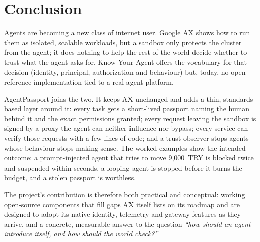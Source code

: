 \section{Conclusion}

Agents are becoming a new class of internet user. Google AX shows how to run them as isolated, scalable workloads, but a sandbox only protects the cluster from the agent; it does nothing to help the rest of the world decide whether to trust what the agent asks for. Know Your Agent offers the vocabulary for that decision (identity, principal, authorization and behaviour) but, today, no open reference implementation tied to a real agent platform.

AgentPassport joins the two. It keeps AX unchanged and adds a thin, standards-based layer around it: every task gets a short-lived passport naming the human behind it and the exact permissions granted; every request leaving the sandbox is signed by a proxy the agent can neither influence nor bypass; every service can verify those requests with a few lines of code; and a trust observer stops agents whose behaviour stops making sense. The worked examples show the intended outcome: a prompt-injected agent that tries to move 9,000~TRY is blocked twice and suspended within seconds, a looping agent is stopped before it burns the budget, and a stolen passport is worthless.

The project's contribution is therefore both practical and conceptual: working open-source components that fill gaps AX itself lists on its roadmap and are designed to adopt its native identity, telemetry and gateway features as they arrive, and a concrete, measurable answer to the question \emph{``how should an agent introduce itself, and how should the world check?''}
